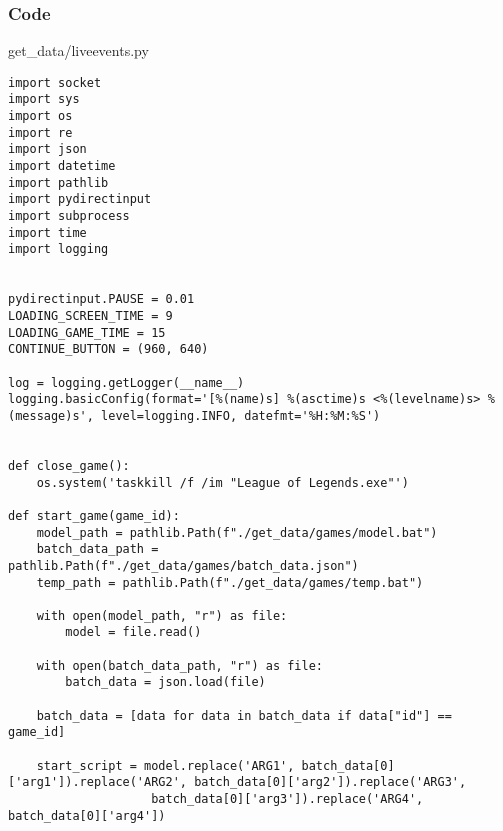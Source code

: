 \documentclass{beamer}
\begin{document}

\begin{frame}[fragile]
    \frametitle{Code}
    \scriptsize
    get\_data/liveevents.py \newline
    \fontsize{3pt}{5pt}\selectfont
    \begin{verbatim}
import socket
import sys
import os
import re
import json
import datetime
import pathlib
import pydirectinput
import subprocess
import time
import logging


pydirectinput.PAUSE = 0.01
LOADING_SCREEN_TIME = 9
LOADING_GAME_TIME = 15
CONTINUE_BUTTON = (960, 640)

log = logging.getLogger(__name__)
logging.basicConfig(format='[%(name)s] %(asctime)s <%(levelname)s> %(message)s', level=logging.INFO, datefmt='%H:%M:%S')


def close_game():
    os.system('taskkill /f /im "League of Legends.exe"')

def start_game(game_id):
    model_path = pathlib.Path(f"./get_data/games/model.bat")
    batch_data_path = pathlib.Path(f"./get_data/games/batch_data.json")
    temp_path = pathlib.Path(f"./get_data/games/temp.bat")

    with open(model_path, "r") as file:
        model = file.read()

    with open(batch_data_path, "r") as file:
        batch_data = json.load(file)

    batch_data = [data for data in batch_data if data["id"] == game_id]

    start_script = model.replace('ARG1', batch_data[0]['arg1']).replace('ARG2', batch_data[0]['arg2']).replace('ARG3',
                    batch_data[0]['arg3']).replace('ARG4', batch_data[0]['arg4'])
    \end{verbatim}
\end{frame}
\end{document}
